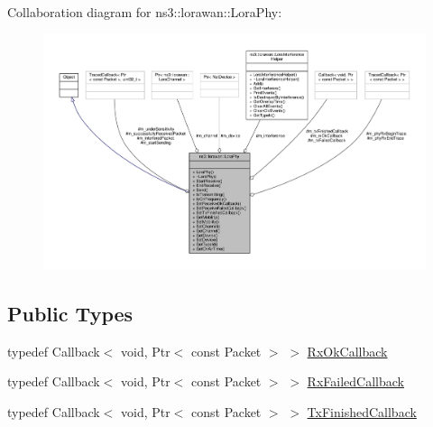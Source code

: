 Collaboration diagram for ns3\+:\+:lorawan\+:\+:Lora\+Phy\+:
\nopagebreak
\begin{figure}[H]
\begin{center}
\leavevmode
\includegraphics[width=350pt]{classns3_1_1lorawan_1_1LoraPhy__coll__graph}
\end{center}
\end{figure}
\subsection*{Public Types}
\begin{DoxyCompactItemize}
\item 
typedef Callback$<$ void, Ptr$<$ const Packet $>$ $>$ \hyperlink{classns3_1_1lorawan_1_1LoraPhy_ae9342f40d4eb2b1f004309f6fb444a50}{Rx\+Ok\+Callback}
\item 
typedef Callback$<$ void, Ptr$<$ const Packet $>$ $>$ \hyperlink{classns3_1_1lorawan_1_1LoraPhy_a2229a4841f407ee9931e563622edf663}{Rx\+Failed\+Callback}
\item 
typedef Callback$<$ void, Ptr$<$ const Packet $>$ $>$ \hyperlink{classns3_1_1lorawan_1_1LoraPhy_a3dd8f8ea5717fc775dde00ad54f5402c}{Tx\+Finished\+Callback}
\end{DoxyCompactItemize}
